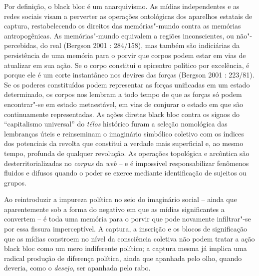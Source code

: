 Por definição, o black bloc é um anarquivismo. As mídias independentes e
as redes sociais visam a perverter as operações ontológicas dos
aparelhos estatais de captura, restabelecendo os direitos das
memórias"-mundo contra as memórias antropogênicas. As memórias"-mundo
equivalem a regiões inconscientes, ou não"-percebidas, do real (Bergson
2001 : 284/158), mas também são indiciárias da persistência de uma
memória para o porvir que corpos podem estar em vias de atualizar em sua
ação. Se o corpo constitui o epicentro político por excelência, é porque
ele é um corte instantâneo nos devires das forças (Bergson 2001 :
223/81). Se os poderes constituídos podem representar as forças
unificadas em um estado determinado, os corpos nos lembram a todo tempo
de que as forças só podem encontrar"-se em estado metaestável, em vias de
conjurar o estado em que são continuamente representadas. As ações
diretas black bloc contra os signos do ``capitalismo universal'' do
\emph{télos }histórico furam a seleção nomológica das lembranças úteis e
reinseminam o imaginário simbólico coletivo com os índices dos
potenciais da revolta que constitui a verdade mais superficial e, ao
mesmo tempo, profunda de qualquer revolução. As operações topológica e
arcôntica são desterritorializadas no \emph{corpus} da \emph{web }-- e é
impossível responsabilizar fenômenos fluidos e difusos quando o poder se
exerce mediante identificação de sujeitos ou grupos.

Ao reintroduzir a impureza política no seio do imaginário social --
ainda que aparentemente sob a forma do negativo em que as mídias
significantes a convertem -- é toda uma memória para o porvir que pode
novamente infiltrar"-se por essa fissura imperceptível. A captura, a
inscrição e os blocos de significação que as mídias constroem no nível
da consciência coletiva não podem tratar a ação black bloc como um mero
indiferente político; a captura mesma já implica uma radical produção de
diferença política, ainda que apanhada pelo olho, quando deveria, como o
\emph{desejo}, ser apanhada pelo rabo.

